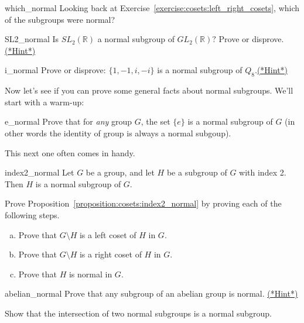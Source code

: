 {\begin{exercise}{which_normal}
Looking back at Exercise~\ref{exercise:cosets:left_right_cosets}, which of the subgroups were normal?
\end{exercise}

\begin{exercise}{SL2_normal}
Is $SL_2( {\mathbb R} )$ a normal subgroup of $GL_2( {\mathbb R})?$  Prove or disprove.
\hyperref[sec:cosets:hints]{(*Hint*)}
\end{exercise}

\begin{exercise}{i_normal}
Prove or disprove:  $\{ 1, -1, i, -i \}$ is a normal subgroup of $Q_8$.\hyperref[sec:cosets:hints]{(*Hint*)}
\end{exercise}

Now let's see if you can prove some general facts about normal subgroups.  We'll start with a warm-up:


\begin{exercise}{e_normal}
Prove that for \emph{any} group $G$, the set $\{e\}$ is a normal subgroup of $G$ (in other words the identity of group is always a normal subgoup).
\end{exercise} 

This next one often comes in handy.

\begin{prop}{index2_normal} Let $G$ be a group, and let $H$ be a subgroup of $G$ with index 2. Then $H$ is a normal subgroup of $G$.
\end{prop}
\begin{exercise}{}
Prove Proposition~\ref{proposition:cosets:index2_normal} by proving each of the following steps.
\begin{enumerate}[(a)]
\item
Prove that $G \setminus H$ is a left coset of $H$ in $G$.
\item
Prove that $G \setminus H$ is a right coset of $H$ in $G$.
\item 
Prove that $H$ is normal in $G$.
\end{enumerate}
\end{exercise}

\begin{exercise}{abelian_normal} Prove that any subgroup of an abelian group is normal.
\hyperref[sec:cosets:hints]{(*Hint*)}
\end{exercise}

\begin{exercise}{}
Show that the intersection of two normal subgroups is a normal
subgroup. 
\end{exercise}



}
